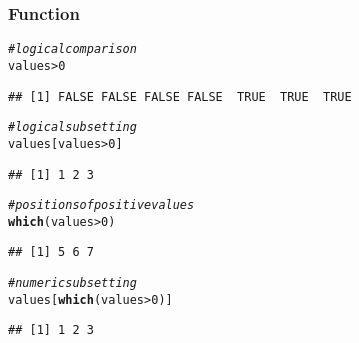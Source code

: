 \documentclass[12pt]{beamer}\usepackage[]{graphicx}\usepackage[]{color}
\makeatletter
\newcommand{\hlnum}[1]{\textcolor[rgb]{0.686,0.059,0.569}{#1}}%
\newcommand{\hlcom}[1]{\textcolor[rgb]{0.678,0.584,0.686}{\textit{#1}}}%
\newcommand{\hlopt}[1]{\textcolor[rgb]{0,0,0}{#1}}%
\newcommand{\hlstd}[1]{\textcolor[rgb]{0.345,0.345,0.345}{#1}}%
\newcommand{\hlkwd}[1]{\textcolor[rgb]{0.737,0.353,0.396}{\textbf{#1}}}%
\newenvironment{kframe}{%
 \def\at@end@of@kframe{}%
 \ifinner\ifhmode%
  \def\at@end@of@kframe{\end{minipage}}%
  \begin{minipage}{\columnwidth}%
 \fi\fi%
 \def\FrameCommand##1{\hskip\@totalleftmargin \hskip-\fboxsep
 \colorbox{shadecolor}{##1}\hskip-\fboxsep
     \hskip-\linewidth \hskip-\@totalleftmargin \hskip\columnwidth}%
 \MakeFramed {\advance\hsize-\width
   \@totalleftmargin\z@ \linewidth\hsize
   \@setminipage}}%
 {\par\unskip\endMakeFramed%
 \at@end@of@kframe}
\newenvironment{knitrout}{}{} %
\makeatother
\begin{document}
\begin{frame}[fragile]
\frametitle{Function }

\begin{knitrout}\scriptsize
{}\color{fgcolor}\begin{kframe}
\begin{alltt}
\hlcom{# logical comparison}
\hlstd{values} \hlopt{>} \hlnum{0}
\end{alltt}
\begin{verbatim}
## [1] FALSE FALSE FALSE FALSE  TRUE  TRUE  TRUE
\end{verbatim}
\begin{alltt}
\hlcom{# logical subsetting}
\hlstd{values[values} \hlopt{>} \hlnum{0}\hlstd{]}
\end{alltt}
\begin{verbatim}
## [1] 1 2 3
\end{verbatim}
\begin{alltt}
\hlcom{# positions of positive values}
\hlkwd{which}\hlstd{(values} \hlopt{>} \hlnum{0}\hlstd{)}
\end{alltt}
\begin{verbatim}
## [1] 5 6 7
\end{verbatim}
\begin{alltt}
\hlcom{# numeric subsetting}
\hlstd{values[}\hlkwd{which}\hlstd{(values} \hlopt{>} \hlnum{0}\hlstd{)]}
\end{alltt}
\begin{verbatim}
## [1] 1 2 3
\end{verbatim}
\end{kframe}
\end{knitrout}

\end{frame}

\end{document}
